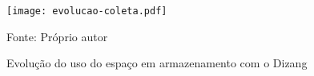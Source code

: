 
\begin{figure}[htb!]
\footnotesize
\caption{Evolução do uso do espaço em armazenamento com o Dizang}
\texttt{[image: evolucao-coleta.pdf]}
\centering
\label{fig:evolucao-coleta}
\begin{center}
Fonte: Próprio autor 
\end{center}
\end{figure}


\begin{comment}
A Figura \ref{fig:memoria_salva}, por sua vez, mostra uma listagem de alguns dos instantâneos de memória salvos pela solução depois que os contêineres são removidos. 
%
Nela pode-se ver que as coletas continuaram no disco da máquina mesmo após a remoção dos contêineres. 
%
Usando o identificador do contêiner e da imagem, consegue-se associar a evidência a sua origem (i.e., a imagem e o contêiner), conforme esperado para uma análise forense.
%
Essa capacidade se mantém após a detecção de uma ameaça, pois nesse caso coletas mais antigas deixam de ser apagadas.
%
Assim, é possível descrever o estado do sistema antes e depois do incidente \cite{Case_Memory_Forensics:2014}, permitindo-se, por exemplo, que ataques de injeção de código em memória sejam analisados.


\begin{figure*}[htb!]
\footnotesize
\caption{Exemplo de lista de instantâneos de memória.}
\fbox{
\texttt{[image: memoria\_salva.jpg]}
}
\centering
\label{fig:memoria_salva}
\end{figure*}

\end{comment}

